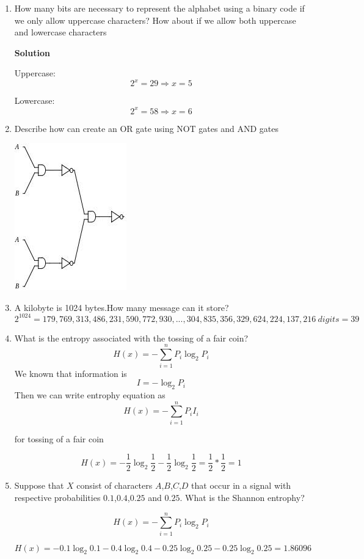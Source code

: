 \documentclass{article}
\begin{document}
\begin{enumerate}
\item How many bits are necessary to represent the alphabet using a binary code if we only allow uppercase characters? How about if we allow both uppercase and lowercase characters

\textbf{Solution}

Uppercase:
\[2^x = 29 \Rightarrow x=5\]

Lowercase:
\[2^x = 58 \Rightarrow x=6\]

\item Describe how can create an OR gate using NOT gates and AND gates
\begin{center}
\includegraphics[scale=1]{orwithand.jpg} 
\end{center}


\item A kilobyte is 1024 bytes.How many message can it store?
\[2^1024 = 179,769,313,486,231,590,772,930,...,304,835,356,329,624,224,137,216 \ digits=39\]
\item What is the entropy associated with the tossing of a fair coin?
\[ H(x) =-\sum_{i=1}^{n} P_{i} \log_{2} P_{i} \] 
We known that information is
\[I = - \log_{2} P_{i}\] 
Then we can write entrophy equation as
\[ H(x) =-\sum_{i=1}^{n} P_{i} I_{i} \]

for tossing of a fair coin

\[ H(x) =- \frac{1}{2} \log_{2} \frac{1}{2} - \frac{1}{2} \log_{2} \frac{1}{2}  = \frac{1}{2} * \frac{1}{2}= 1\] 

\item Suppose that $X$ consist of characters $A$,$B$,$C$,$D$ that occur in a signal with respective probabilities $0.1$,$0.4$,$0.25$ and $0.25$. What is the Shannon entrophy?

\[ H(x) =-\sum_{i=1}^{n} P_{i} \log_{2} P_{i} \] 

\[ H(x) =- 0.1 \log_{2} 0.1 - 0.4 \log_{2}  0.4 - 0.25 \log_{2} 0.25 - 0.25 \log_{2} 0.25  = 1.86096\] 


\end{enumerate}
\end{document}
